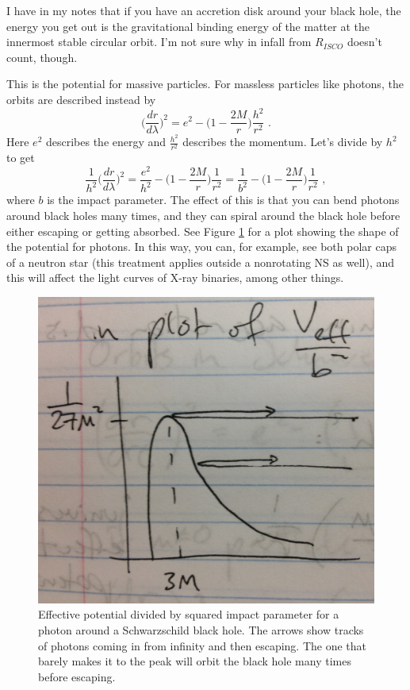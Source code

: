 I have in my notes that if you have an accretion disk around your black hole, the energy you get out is the gravitational binding energy of the matter at the innermost stable circular orbit. I'm not sure why in infall from $R_{ISCO}$ doesn't count, though.


This is the potential for massive particles. For massless particles like photons, the orbits are described instead by
\begin{equation}
\biggl(\frac{dr}{d\lambda} \biggr)^2 = e^2 - \biggl( 1 - \frac{2M}{r} \biggr)  \frac{h^2}{r^2}\,\,.
\end{equation}
Here $e^2$ describes the energy and $\frac{h^2}{r^2}$ describes the momentum. Let's divide by $h^2$ to get
\begin{equation}
\frac{1}{h^2} \biggl( \frac{dr}{d\lambda} \biggr)^2 = \frac{e^2}{h^2} - \biggl( 1 - \frac{2M}{r} \biggr) \frac{1}{r^2} = \frac{1}{b^2} - \biggl( 1 - \frac{2M}{r} \biggr) \frac{1}{r^2}\,\, ,
\end{equation}
where $b$ is the impact parameter. The effect of this is that you can bend photons around black holes many times, and they can spiral around the black hole before either escaping or getting absorbed. See Figure \ref{f:veff_phot} for a plot showing the shape of the potential for photons. In this way, you can, for example, see both polar caps of a neutron star (this treatment applies outside a nonrotating NS as well), and this will affect the light curves of X-ray binaries, among other things.

\begin{figure}[!h]
\begin{center}
\includegraphics[width=\textwidth]{veff_phot.jpg}
\caption{Effective potential divided by squared impact parameter for a photon around a Schwarzschild black hole. The arrows show tracks of photons coming in from infinity and then escaping. The one that barely makes it to the peak will orbit the black hole many times before escaping. \label{f:veff_phot}}
\end{center}
\end{figure}

